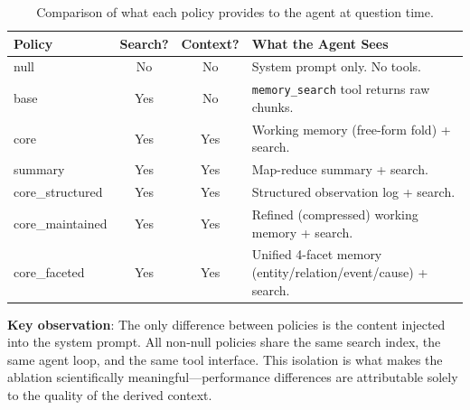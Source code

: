 \documentclass[11pt,a4paper]{article}
\begin{document}
\begin{table}[H]
\centering
\small
\caption{Comparison of what each policy provides to the agent at question time.}
\label{tab:policy-comparison}
\begin{tabularx}{\textwidth}{@{}lccX@{}}
\toprule
\textbf{Policy} & \textbf{Search?} & \textbf{Context?} & \textbf{What the Agent Sees} \\
\midrule
null & No & No & System prompt only. No tools. \\
base & Yes & No & \texttt{memory\_search} tool returns raw chunks. \\
core & Yes & Yes & Working memory (free-form fold) + search. \\
summary & Yes & Yes & Map-reduce summary + search. \\
core\_structured & Yes & Yes & Structured observation log + search. \\
core\_maintained & Yes & Yes & Refined (compressed) working memory + search. \\
core\_faceted & Yes & Yes & Unified 4-facet memory (entity/relation/event/cause) + search. \\
\bottomrule
\end{tabularx}
\end{table}

\textbf{Key observation}: The only difference between policies is the content injected into the system prompt. All non-null policies share the same search index, the same agent loop, and the same tool interface. This isolation is what makes the ablation scientifically meaningful---performance differences are attributable solely to the quality of the derived context.
\end{document}
